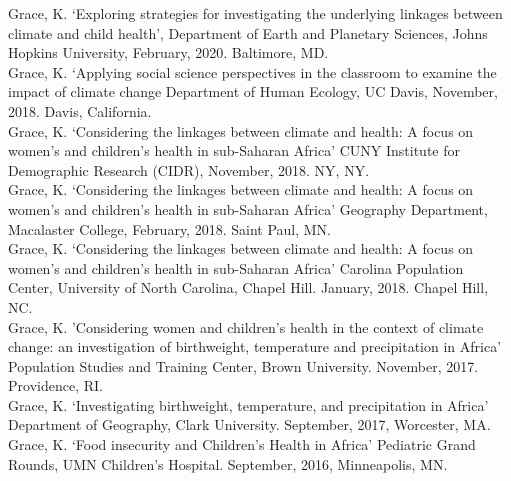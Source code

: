\documentclass[11pt]{article} %
\begin{document}
\noindent
Grace, K. `Exploring strategies for investigating the underlying linkages between climate and child health', Department of Earth and Planetary Sciences, Johns Hopkins University, February, 2020. Baltimore, MD.\\

\noindent
Grace, K. `Applying social science perspectives in the classroom to examine the impact of climate change  Department of Human Ecology, UC Davis, November, 2018. Davis, California.\\


\noindent
Grace, K. `Considering the linkages between climate and health: A focus on women's and children's health in sub-Saharan Africa' CUNY Institute for Demographic Research (CIDR), November, 2018. NY, NY. \\


\noindent
Grace, K. `Considering the linkages between climate and health: A focus on women's and children's health in sub-Saharan Africa' Geography Department, Macalaster College, February, 2018. Saint Paul, MN. \\

\noindent
Grace, K. `Considering the linkages between climate and health: A focus on women's and children's health in sub-Saharan Africa' Carolina Population Center, University of North Carolina, Chapel Hill.  January, 2018. Chapel Hill, NC.\\

\noindent
Grace, K. 'Considering women and children's health in the context of climate change: an investigation of birthweight, temperature and precipitation in Africa' Population Studies and Training Center, Brown University.  November, 2017. \\ Providence, RI.\\

\noindent
Grace, K. `Investigating birthweight, temperature, and precipitation in Africa' Department of Geography, Clark University. September, 2017, Worcester, MA.\\

\noindent
Grace, K. `Food insecurity and Children's Health in Africa' Pediatric Grand Rounds, UMN Children's Hospital. September, 2016, Minneapolis, MN.\\
\end{document}
